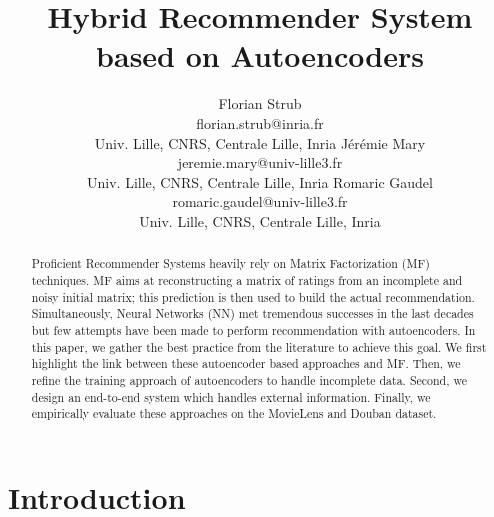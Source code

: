\documentclass{article}
\begin{document}
\title{Hybrid Recommender System based on Autoencoders}

\author{Florian Strub \\ \small florian.strub@inria.fr\normalsize \\ \small Univ. Lille, CNRS, Centrale Lille, Inria \And J\'er\'emie Mary \\ \small jeremie.mary@univ-lille3.fr\normalsize \\ \small Univ. Lille, CNRS, Centrale Lille, Inria \And Romaric Gaudel \\ \small romaric.gaudel@univ-lille3.fr\normalsize \\ \small Univ. Lille, CNRS, Centrale Lille, Inria }


\maketitle


\begin{abstract}
Proficient Recommender Systems heavily rely on Matrix Factorization (MF) techniques. MF aims at reconstructing a matrix of ratings from an incomplete and noisy initial matrix; this prediction is then used to build the actual recommendation. Simultaneously, Neural Networks (NN) met tremendous successes in the last decades but few attempts have been made to perform recommendation with autoencoders. In this paper, we gather the best practice from the literature to achieve this goal. We first highlight the link between these autoencoder based approaches and MF. Then, we refine the training approach of autoencoders to handle incomplete data. Second, we design an end-to-end system which handles external information. Finally, we empirically evaluate these approaches on the MovieLens and Douban dataset. 
\end{abstract}

\section{Introduction}
\end{document}
